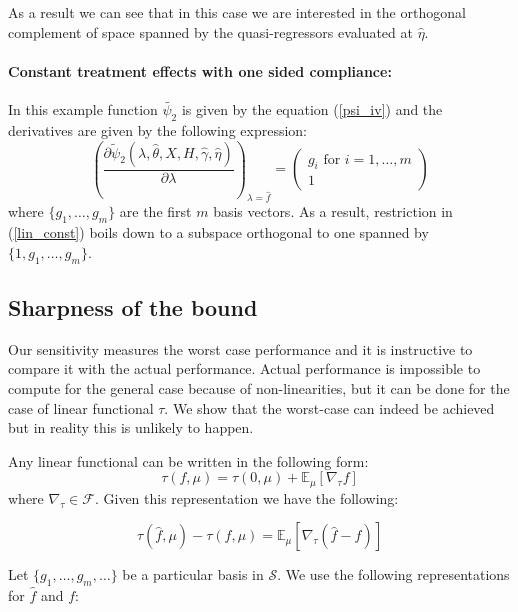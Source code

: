 \documentclass[12pt]{article}
\theoremstyle{plain}
\begin{document}
As a result we can see that in this case we are interested in the orthogonal complement of space spanned by the quasi-regressors evaluated at $\hat \eta$.

\paragraph{Constant treatment effects with one sided compliance:} In this example function $\tilde{\psi_2}$ is given by the equation (\ref{psi_iv}) and  the derivatives are given by the following expression: 
\begin{equation}
\left(\frac{\partial \tilde{\psi}_2(\lambda,\hat\theta, X, H, \hat\gamma, \hat\eta)}{\partial \lambda}\right)_{\lambda = \hat f} =
\begin{pmatrix}
g_i \text{ for $i=1, \dots, m$}\\
1
\end{pmatrix}
\end{equation}
where $\{g_1,\dots, g_m\}$ are the first $m$ basis vectors. As a result, restriction in (\ref{lin_const}) boils down to a subspace orthogonal to one spanned by $\{1,g_1,\dots, g_m\}$.


\subsection{Sharpness of the bound}

Our sensitivity measures the worst case performance and it is instructive to compare it with the actual performance. Actual performance is impossible to compute for the general case because of non-linearities, but it can be done for the case of linear functional $\tau$. We show that the worst-case can indeed be achieved but in reality this is unlikely to happen.

Any linear functional can be written in the following form:
\begin{equation}
\tau(f,\mu) = \tau(0,\mu) + \mathbb{E}_{\mu}[\nabla_{\tau} f]
\end{equation}
where $\nabla_{\tau}\in \mathcal{F}$. Given this representation we have the following:

\begin{equation}
\tau(\hat f,\mu)-\tau(f,\mu) = \mathbb{E}_{\mu}[\nabla_{\tau}(\hat f -f)]
\end{equation}

Let $\{g_1,\dots,g_m, \dots\}$ be a particular basis in $\mathcal{S}$. We use the following representations for $\hat f$ and $f$:
\end{document}
